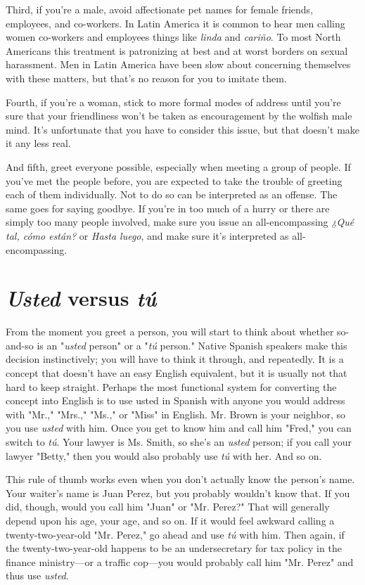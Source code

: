 \documentclass[14pt,a4paper,oneside]{memoir}
\begin{document}
Third, if you're a male, avoid affectionate pet names for female
friends, employees, and co-workers. In Latin America it is common to
hear men calling women co-workers and employees things like \emph{linda}
and \emph{cariño}. To most North Americans this treatment is patronizing at
best and at worst borders on sexual harassment. Men in Latin America
have been slow about concerning themselves with these matters, but
that's no reason for you to imitate them.

Fourth, if you're a woman, stick to more formal modes of address until you're sure that your friendliness won't be taken as encouragement by the wolfish male mind. It's unfortunate that you have to
consider this issue, but that doesn't make it any less real.

And fifth, greet everyone possible, especially when meeting
a group of people. If you've met the people before, you are expected
to take the trouble of greeting each of them individually. Not to do
so can be interpreted as an offense. The same goes for saying goodbye. If you're in too much of a hurry or there are simply too many
people involved, make sure you issue an all-encompassing \emph{¿Qué tal,
	cómo están?} or \emph{Hasta luego}, and make sure it's interpreted as all-encompassing.

\section{\emph{Usted} versus \emph{tú}}

From the moment you greet a person, you will start to think
about whether so-and-so is an "\emph{usted} person" or a "\emph{tú} person." Native
Spanish speakers make this decision instinctively; you will have to
think it through, and repeatedly. It is a concept that doesn't have an
easy English equivalent, but it is usually not that hard to keep straight.
Perhaps the most functional system for converting the concept into
English is to use usted in Spanish with anyone you would address with
"Mr.," "Mrs.," "Ms.," or "Miss" in English. Mr. Brown is your neighbor, so you use \emph{usted} with him. Once you get to know him and call
him "Fred," you can switch to \emph{tú}. Your lawyer is Ms. Smith, so she's
an \emph{usted} person; if you call your lawyer "Betty," then you would also
probably use \emph{tú} with her. And so on.

This rule of thumb works even when you don't actually know
the person's name. Your waiter's name is Juan Perez, but you probably
wouldn't know that. If you did, though, would you call him "Juan" or
"Mr. Perez?" That will generally depend upon his age, your age, and so
on. If it would feel awkward calling a twenty-two-year-old "Mr. Perez,"
go ahead and use \emph{tú} with him. Then again, if the twenty-two-year-old
happens to be an undersecretary for tax policy in the finance ministry---or a traffic cop---you would probably call him "Mr. Perez" and
thus use \emph{usted}.
\end{document}
